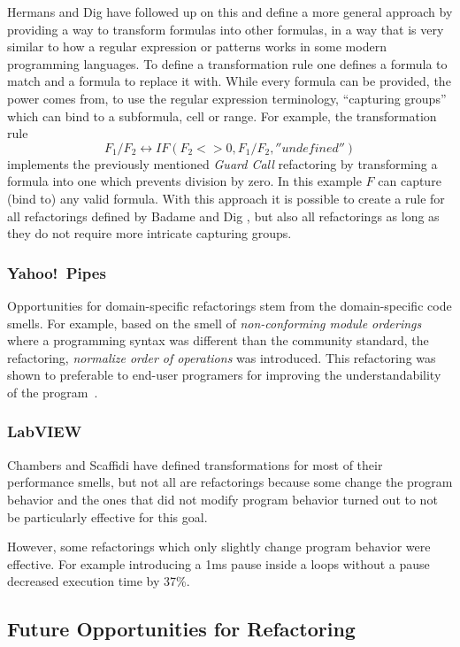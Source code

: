 \documentclass[10pt,conference,compsocconf]{IEEEtran}
\begin{document}
Hermans and Dig \cite{hermans2014bumblebee} have followed up on this and define a more general approach by providing a way to transform formulas into other formulas, in a way that is very similar to how a regular expression or patterns works in some modern programming languages.
To define a transformation rule one defines a formula to match and a formula to replace it with. While every formula can be provided, the power comes from, to use the regular expression terminology, ``capturing groups'' which can bind to a subformula, cell or range. For example, the transformation rule
\[F_1/F_2 \leftrightarrow IF(F_2<>0,F_1/F_2,''undefined'')\]
 implements the previously mentioned \textit{Guard Call} \cite{badame2012refactoring} refactoring by transforming a formula into one which prevents division by zero.
 In this example $F$ can capture (bind to) any valid formula.
 With this approach it is possible to create a rule for all refactorings defined by Badame and Dig \cite{badame2012refactoring}, but also all refactorings as long as they do not require more intricate capturing groups.

\subsubsection{Yahoo!\ Pipes}
Opportunities for domain-specific refactorings stem from the domain-specific code smells. 
For example, based on the smell of \emph{non-conforming module orderings} where a programming syntax was different than the community standard, the refactoring, \emph{normalize order of operations} was introduced. This refactoring was shown to preferable to end-user programers for improving the understandability of the program~\cite{StoleeTSE2013}. 

\subsubsection{LabVIEW}

Chambers and Scaffidi \cite{chambers2015impact} have defined transformations for most of their performance smells, but not all are refactorings because some change the program behavior and the ones that did not modify program behavior turned out to not be particularly effective for this goal.

However, some refactorings which only slightly change program behavior were effective. For example introducing a 1ms pause inside a loops without a pause decreased execution time by 37\%.

\subsection{Future Opportunities for Refactoring}
\end{document}

